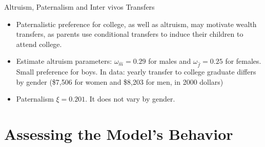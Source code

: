 \documentclass{beamer}
\begin{document}
\begin{frame}{Altruism, Paternalism and Inter vivos Transfers}
\begin{itemize}
\item Paternalistic preference for college, as well as altruism, may motivate wealth transfers, as parents use conditional transfers to induce their children to attend college.
\item Estimate altruism parameters: $\omega_{\hat{m}}=0.29$ for males and $\omega_{\hat{f}}=0.25$ for females. Small preference for boys. In data: yearly transfer to college graduate differs by gender (\$7,506 for women and \$8,203 for men, in 2000 dollars)
\item Paternalism $\xi=0.201$. It does not vary by gender.

\end{itemize}

\end{frame}


\section{Assessing the Model’s Behavior}
\end{document}
